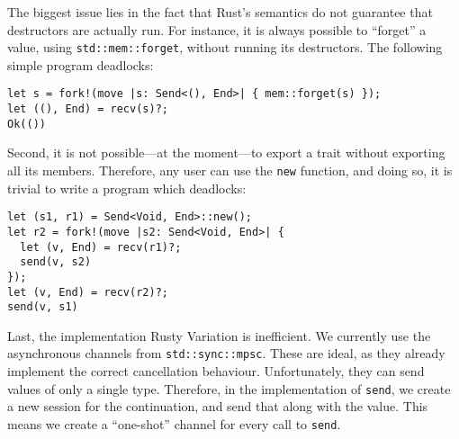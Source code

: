 \documentclass[sigconf,UKEnglish,natbib=false]{acmart}
\begin{document}
The biggest issue lies in the fact that Rust's semantics do not guarantee that destructors are actually run. For instance, it is always possible to ``forget'' a value, using \lstinline{std::mem::forget}, without running its destructors. The following simple program deadlocks:
\begin{lstlisting}
let s = fork!(move |s: Send<(), End>| { mem::forget(s) });
let ((), End) = recv(s)?;
Ok(())
\end{lstlisting}

Second, it is not possible---at the moment---to export a trait without exporting all its members. Therefore, any user can use the \lstinline{new} function, and doing so, it is trivial to write a program which deadlocks: 
\begin{lstlisting}
let (s1, r1) = Send<Void, End>::new();
let r2 = fork!(move |s2: Send<Void, End>| {
  let (v, End) = recv(r1)?;
  send(v, s2)
});
let (v, End) = recv(r2)?;
send(v, s1)
\end{lstlisting}

Last, the implementation Rusty Variation is inefficient. We currently use the asynchronous channels from \lstinline{std::sync::mpsc}. These are ideal, as they already implement the correct cancellation behaviour. Unfortunately, they can send values of only a single type. Therefore, in the implementation of \lstinline{send}, we create a new session for the continuation, and send that along with the value. This means we create a ``one-shot'' channel for every call to \lstinline{send}.

\clearpage
\printbibliography
\end{document}
